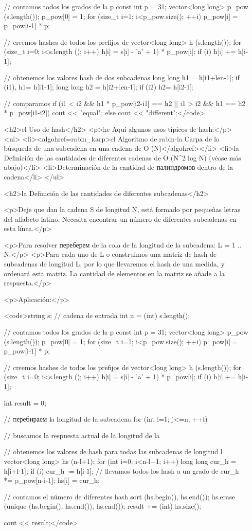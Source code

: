 // contamos todos los grados de la p
const int p = 31;
vector<long long> p_pow (s.length());
p_pow[0] = 1;
for (size_t i=1; i<p_pow.size(); ++i)
p_pow[i] = p_pow[i-1] * p;

// creemos hashes de todos los prefijos de
vector<long long> h (s.length());
for (size_t i=0; i<s.length (); i++)
{
h[i] = s[i] - 'a' + 1) * p_pow[i];
if (i) h[i] += h[i-1];
}

// obtenemos los valores hash de dos subcadenas
long long h1 = h[i1+len-1];
if (i1), h1= h[i1-1];
long long h2 = h[i2+len-1];
if (i2) h2= h[i2-1];

// comparamos
if (i1 < i2 && h1 * p_pow[i2-i1] == h2 ||
i1 > i2 && h1 == h2 * p_pow[i1-i2])
cout << "equal";
else
cout << "different";</code>

<h2>el Uso de hash</h2>
<p>he Aquí algunos usos típicos de hash:</p>
<ul>
<li><algohref=rabin_karp>el Algoritmo de rabin-la Carpa de la búsqueda de una subcadena en una cadena de O (N)</algohref></li>
<li>la Definición de las cantidades de diferentes cadenas de O (N^2 log N) (véase más abajo)</li>
<li>Determinación de la cantidad de палиндромов dentro de la cadena</li>
</ul>

<h2>la Definición de las cantidades de diferentes subcadenas</h2>

<p>Deje que dan la cadena S de longitud N, está formado por pequeñas letras del alfabeto latino. Necesita encontrar un número de diferentes subcadenas en esta línea.</p>

<p>Para resolver переберем de la cola de la longitud de la subcadena: L = 1 .. N.</p>
<p>Para cada uno de L o construimos una matriz de hash de subcadenas de longitud L, por lo que llevaremos el hash de una medida, y ordenará esta matriz. La cantidad de elementos en la matriz se añade a la respuesta.</p>

<p>Aplicación:</p>

<code>string s; // cadena de entrada
int n = (int) s.length();

// contamos todos los grados de la p
const int p = 31;
vector<long long> p_pow (s.length());
p_pow[0] = 1;
for (size_t i=1; i<p_pow.size(); ++i)
p_pow[i] = p_pow[i-1] * p;

// creemos hashes de todos los prefijos de
vector<long long> h (s.length());
for (size_t i=0; i<s.length (); i++)
{
h[i] = s[i] - 'a' + 1) * p_pow[i];
if (i) h[i] += h[i-1];
}

int result = 0;

// перебираем la longitud de la subcadena
for (int l=1; j<=n; ++l)
{
// buscamos la respuesta actual de la longitud de la

// obtenemos los valores de hash para todas las subcadenas de longitud l
vector<long long> hs (n-l+1);
for (int i=0; i<n-l+1; i++)
{
long long cur_h = h[i+l-1];
if (i) cur_h -= h[i-1];
// llevamos todos los hash a un grado de
cur_h *= p_pow[n-i-1];
hs[i] = cur_h;
}

// contamos el número de diferentes hash
sort (hs.begin(), hs.end());
hs.erase (unique (hs.begin(), hs.end()), hs.end());
result += (int) hs.size();
}

cout << result;</code>
